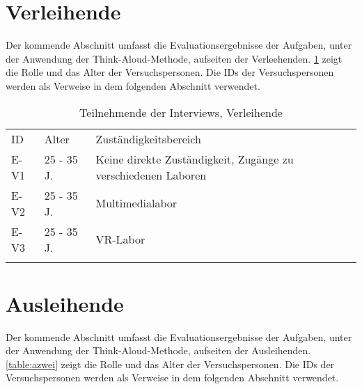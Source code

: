 \section{Verleihende}
Der kommende Abschnitt umfasst die Evaluationsergebnisse der Aufgaben, unter der
Anwendung der Think-Aloud-Methode, aufseiten der Verleehenden. \ref{table:vzwei}
zeigt die Rolle und das Alter der Versuchspersonen. Die IDs der Versuchspersonen
werden als Verweise in dem folgenden Abschnitt verwendet.


\begin{table}[h]
  \centering
  \caption{Teilnehmende der Interviews, Verleihende}
  \begin{tabular}{lll}
    \arrayrulecolor{maincolor}\hline
    \sffamily\color{maincolor}ID & \sffamily\color{maincolor}Alter &
    \sffamily\color{maincolor}Zuständigkeitsbereich \\
    \arrayrulecolor{maincolor}\hline
    E-V1                         & 25 - 35 J.                      & Keine
    direkte Zuständigkeit, Zugänge zu verschiedenen Laboren \\
    E-V2                         & 25 - 35 J.                      &
    Multimedialabor                                                           \\
    E-V3                         & 25 - 35 J.                      & VR-Labor \\
    \arrayrulecolor{maincolor}\hline
  \end{tabular}
  \label{table:vzwei}
\end{table}



\section{Ausleihende}

Der kommende Abschnitt umfasst die Evaluationsergebnisse der Aufgaben, unter der
Anwendung der Think-Aloud-Methode, aufseiten der Ausleihenden. \ref{table:azwei}
zeigt die Rolle und das Alter der Versuchspersonen. Die IDs der Versuchspersonen
werden als Verweise in dem folgenden Abschnitt verwendet.

